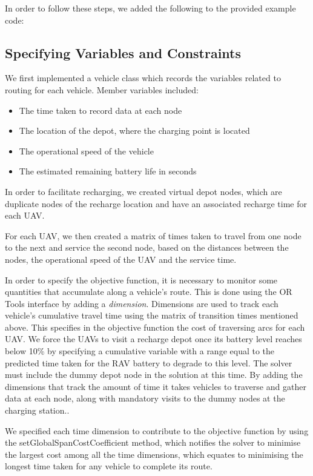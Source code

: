 In order to follow these steps, we added the following to the provided example code:

\subsection{Specifying Variables and Constraints}
We first implemented a vehicle class which records the variables related to routing for each vehicle. Member variables included:
\begin{itemize}
    \item The time taken to record data at each node
    \item The location of the depot, where the charging point is located
    \item The operational speed of the vehicle
    \item The estimated remaining battery life in seconds
\end{itemize}
In order to facilitate recharging, we created virtual depot nodes, which are duplicate nodes of the recharge location and have an associated recharge time for each UAV.

For each UAV, we then created a matrix of times taken to travel from one node to the next and service the second node, based on the distances between the nodes, the operational speed of the UAV and the service time.

In order to specify the objective function, it is necessary to monitor some quantities that accumulate along a vehicle's route. This is done using the OR Tools interface by adding a \textit{dimension}. Dimensions are used to track each vehicle's cumulative travel time using the matrix of transition times mentioned above. This specifies in the objective function the cost of traversing arcs for each UAV. We force the UAVs to visit a recharge depot once its battery level reaches below 10\% by specifying a cumulative variable with a range equal to the predicted time taken for the RAV battery to degrade to this level. The solver must include the dummy depot node in the solution at this time. By adding the dimensions that track the amount of time it takes vehicles to traverse and gather data at each node, along with mandatory visits to the dummy nodes at the charging station..

We specified each time dimension to contribute to the objective function by using the setGlobalSpanCostCoefficient method, which notifies the solver to minimise the largest cost among all the time dimensions, which equates to minimising the longest time taken for any vehicle to complete its route.

